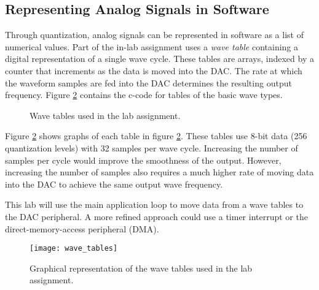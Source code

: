 \documentclass[11pt,fleqn]{book} %
\newcommand{\code}[3]{
    \begin{figure}[]
        \colorbox{gray!20!white}{
            \parbox{\linewidth-2\fboxsep} {
                \centering 
                
            }
        }
        \caption{#2}
        \label{#3}
    \end{figure}
}
\begin{document}
\subsection{Representing Analog Signals in Software} 
 Through quantization, analog signals can be represented in software as a list of numerical values. Part of the in-lab assignment uses a \textit{wave table} containing a digital representation of a single wave cycle. These tables are arrays, indexed by a counter that increments as the data is moved into the DAC. The rate at which the waveform samples are fed into the DAC determines the resulting output frequency. Figure \ref{wave_tables} contains the c-code for tables of the basic wave types.
 
 
%         
% 
 
\code{./Files/wave_tables.c}{Wave tables used in the lab assignment.}{wave_tables}
 
Figure \ref{wave_tables} shows graphs of each table in figure \ref{wave_tables}. These tables use 8-bit data (256 quantization levels) with 32 samples per wave cycle. Increasing the number of samples per cycle would improve the smoothness of the output. However, increasing the number of samples also requires a much higher rate of moving data into the DAC to achieve the same output wave frequency. 

This lab will use the main application loop to move data from a wave tables to the DAC peripheral. A more refined approach could use a timer interrupt or the direct-memory-access peripheral (DMA). 

\begin{figure}[]
    \centering\texttt{[image: wave\_tables]}
    \caption{Graphical representation of the wave tables used in the lab assignment.}
    \label{wave_tables}
\end{figure}
 
\end{document}
